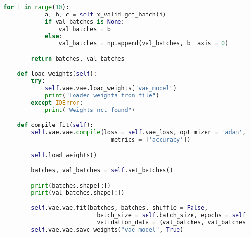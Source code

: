 \begin{lstlisting}[language = Python, frame = single, caption = {La classe che si occupa della compilazione della rete e del fitting dei dati}, captionpos = b]
        for i in range(10):
            a, b, c = self.x_valid.get_batch(i)
            if val_batches is None:
                val_batches = b
            else:
                val_batches = np.append(val_batches, b, axis = 0)

        return batches, val_batches

    def load_weights(self):
        try:
            self.vae.vae.load_weights("vae_model")
            print("Loaded weights from file")
        except IOError:
            print("Weights not found")

    def compile_fit(self):
        self.vae.vae.compile(loss = self.vae_loss, optimizer = 'adam',
                               metrics = ['accuracy'])

        self.load_weights()

        batches, val_batches = self.set_batches()

        print(batches.shape[:])
        print(val_batches.shape[:])

        self.vae.vae.fit(batches, batches, shuffle = False,
                           batch_size = self.batch_size, epochs = self.epochs,
                           validation_data = (val_batches, val_batches))
        self.vae.vae.save_weights("vae_model", True)
\end{lstlisting}
\newpage

